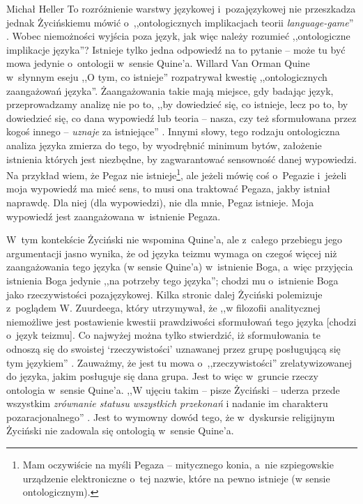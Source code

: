 \begin{artplenv}{Michał Heller}
To rozróżnienie warstwy językowej i~pozajęzykowej nie przeszkadza jednak Życińskiemu mówić o~,,ontologicznych implikacjach teorii \textit{language-game}''
\parencite[][s.~18]{zycinski_teizm_1985}. %
 Wobec niemożności wyjścia poza język, jak więc należy rozumieć ,,ontologiczne implikacje języka''? Istnieje tylko jedna odpowiedź na to pytanie -- może tu być mowa jedynie o~ontologii w~sensie Quine'a. Willard Van Orman Quine w~słynnym eseju ,,O tym, co istnieje'' 
\parencite[][]{quine_o_1969} %
 rozpatrywał kwestię ,,ontologicznych zaangażowań języka''. Żaangażowania takie mają miejsce, gdy badając język, przeprowadzamy analizę nie po to, ,,by dowiedzieć się, co istnieje, lecz po to, by dowiedzieć się, co dana wypowiedź lub teoria -- nasza, czy też sformułowana przez kogoś innego -- \textit{uznaje} za istniejące''
\parencite[][s.~29]{quine_o_1969}. %
 Innymi słowy, tego rodzaju ontologiczna analiza języka zmierza do tego, by wyodrębnić minimum bytów, założenie istnienia których jest niezbędne, by zagwarantować sensowność danej wypowiedzi. Na przykład wiem, że Pegaz nie istnieje\footnote{ Mam oczywiście na myśli Pegaza -- mitycznego konia, a~nie szpiegowskie urządzenie elektroniczne o~tej nazwie, które na pewno istnieje (w sensie ontologicznym).}, ale jeżeli mówię coś o~Pegazie i~jeżeli moja wypowiedź ma mieć sens, to musi ona traktować Pegaza, jakby istniał naprawdę. Dla niej (dla wypowiedzi), nie dla mnie, Pegaz istnieje. Moja wypowiedź jest zaangażowana w~istnienie Pegaza.

W~tym kontekście Życiński nie wspomina Quine'a, ale z~całego przebiegu jego argumentacji jasno wynika, że od języka teizmu wymaga on czegoś więcej niż zaangażowania tego języka (w sensie Quine'a) w~istnienie Boga, a~więc przyjęcia istnienia Boga jedynie ,,na potrzeby tego języka''; chodzi mu o~istnienie Boga jako rzeczywistości pozajęzykowej. Kilka stronic dalej Życiński polemizuje z~poglądem W. Zuurdeega, który utrzymywał, że ,,w filozofii analitycznej niemożliwe jest postawienie kwestii prawdziwości sformułowań tego języka [chodzi o~język teizmu]. Co najwyżej można tylko stwierdzić, iż sformułowania te odnoszą się do swoistej ‘rzeczywistości' uznawanej przez grupę posługującą się tym językiem''
\parencite[][s.~28]{zycinski_teizm_1985}. %
 Zauważmy, że jest tu mowa o~,,rzeczywistości'' zrelatywizowanej do języka, jakim posługuje się dana grupa. Jest to więc w~gruncie rzeczy ontologia w~sensie Quine'a. ,,W ujęciu takim -- pisze Życiński -- uderza przede wszystkim \textit{zrównanie statusu wszystkich przekonań} i nadanie im charakteru pozaracjonalnego'' 
\parencite[][s.~28]{zycinski_teizm_1985}. %
 Jest to wymowny dowód tego, że w~dyskursie religijnym Życiński nie zadowala się ontologią w~sensie Quine'a.


\end{artplenv}
